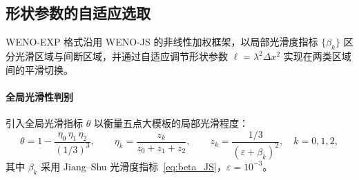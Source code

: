 \documentclass[12pt,a4paper]{article}
\numberwithin{equation}{section}    %
\begin{document}


\subsection{形状参数的自适应选取}

WENO-EXP 格式沿用 WENO-JS 的非线性加权框架，以局部光滑度指标 $\{\beta_k\}$
区分光滑区域与间断区域，并通过自适应调节形状参数 $\ell = \lambda^2\Delta x^2$
实现在两类区域间的平滑切换。

\paragraph{全局光滑性判别}

引入全局光滑指标 $\theta$ 以衡量五点大模板的局部光滑程度：
\begin{equation}
    \label{eq:theta_indicator}
    \theta = 1 - \frac{\eta_0\,\eta_1\,\eta_2}{(1/3)^3},
    \qquad
    \eta_k = \frac{z_k}{z_0 + z_1 + z_2},
    \qquad
    z_k = \frac{1/3}{(\varepsilon + \beta_k)^2},
    \quad k = 0,1,2,
\end{equation}
其中 $\beta_k$ 采用 Jiang--Shu 光滑度指标~\eqref{eq:beta_JS}，$\varepsilon = 10^{-3}$。
\end{document}
